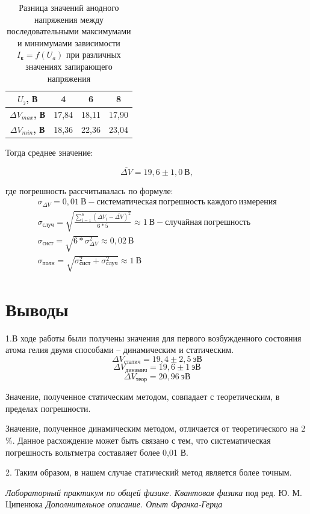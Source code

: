 \documentclass[a4paper,12pt]{article}
\begin{document}
\begin{table}[h]
	\centering
	\caption{Разница значений анодного напряжения между последовательными максимумами и минимумами зависимости $I_к = f(U_a)$ при различных значениях запирающего напряжения}
	\label{table3}
	\begin{tabular}{|c|c|c|c|}
	\hline
	\textbf{$U_з$, В} & 4 & 6 & 8 \\ \hline
	\textbf{$\Delta V_{max}$, В} & 17,84 & 18,11 & 17,90 \\ \hline
	\textbf{$\Delta V_{min}$, В} & 18,36 & 22,36 & 23,04 \\ \hline
	\end{tabular}
\end{table}

Тогда среднее значение:

$$
	\overline {\Delta V} = 19,6 \pm 1,0 \ В,
$$

где погрешность рассчитывалась по формуле:
\begin{gather*}
	\sigma_{\Delta V} = 0,01 \ В - систематическая \ погрешность \ каждого \ измерения \\	
	\sigma_{случ} = \sqrt{\frac{\sum \limits_{i=1}^{6} (\Delta V_i - \overline {\Delta V})^2 }{6 * 5}} \approx 1 \ В - случайная \ погрешность \\
	\sigma_{сист} = \sqrt{6 * \sigma_{\Delta V}^2} \approx 0,02 \ В \\
	\sigma_{полн} = \sqrt{\sigma_{сист}^2 + \sigma_{случ}^2} \approx 1 \ В
\end{gather*}

\newpage

\section*{Выводы}

1.В ходе работы были получены значения для первого возбужденного состояния атома гелия двумя способами -- динамическим и статическим.
$$
	\Delta V_{статич} = 19,4 \pm 2,5 \ эВ 
$$
$$
	\Delta V_{динамич} = 19,6 \pm 1 \ эВ 
$$
$$
	\Delta V_{теор} = 20,96 \ эВ  
$$


Значение, полученное статическим методом, совпадает с теоретическим, в пределах погрешности. 

Значение, полученное динамическим методом, отличается от теоретического на 2 \%. Данное расхождение может быть связано с тем, что систематическая погрешность вольтметра составляет более 0,01 В.

2. Таким образом, в нашем случае статический метод является более точным.

\begin{thebibliography}{2}
	 \emph{Лабораторный практикум по общей физике. Квантовая физика} под ред. Ю. М. Ципенюка
	 \emph{Дополнительное описание. Опыт Франка-Герца}
\end{thebibliography}
\end{document}
